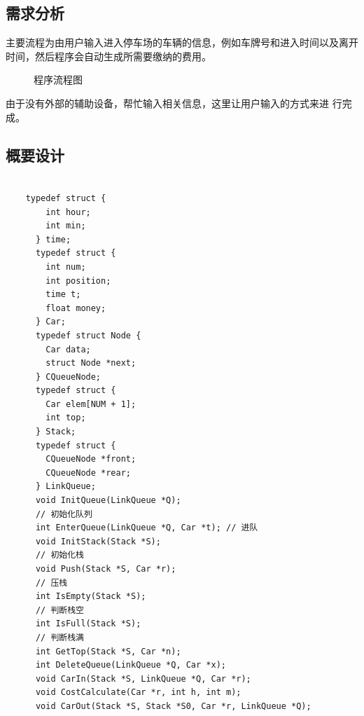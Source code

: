 \documentclass[UTF8,titlepage]{ctexart}
\numberwithin{figure}{section}
\begin{document}
\subsection{需求分析}
主要流程为由用户输入进入停车场的车辆的信息，例如车牌号和进入时间以及离开时间，然后程序会自动生成所需要缴纳的费用。

\begin{figure}[H]
\centering
 \caption{程序流程图}
 \label{}
\end{figure}
由于没有外部的辅助设备，帮忙输入相关信息，这里让用户输入的方式来进
行完成。

\subsection{概要设计}
\begin{verbatim}

    typedef struct {
        int hour;
        int min;
      } time;
      typedef struct {
        int num;
        int position;
        time t;
        float money;
      } Car;
      typedef struct Node {
        Car data;
        struct Node *next;
      } CQueueNode;
      typedef struct {
        Car elem[NUM + 1];
        int top;
      } Stack;
      typedef struct {
        CQueueNode *front;
        CQueueNode *rear;
      } LinkQueue;
      void InitQueue(LinkQueue *Q);
      // 初始化队列
      int EnterQueue(LinkQueue *Q, Car *t); // 进队
      void InitStack(Stack *S);
      // 初始化栈
      void Push(Stack *S, Car *r);
      // 压栈
      int IsEmpty(Stack *S);
      // 判断栈空
      int IsFull(Stack *S);
      // 判断栈满
      int GetTop(Stack *S, Car *n);
      int DeleteQueue(LinkQueue *Q, Car *x);
      void CarIn(Stack *S, LinkQueue *Q, Car *r);
      void CostCalculate(Car *r, int h, int m);
      void CarOut(Stack *S, Stack *S0, Car *r, LinkQueue *Q);
\end{verbatim}
\end{document}
